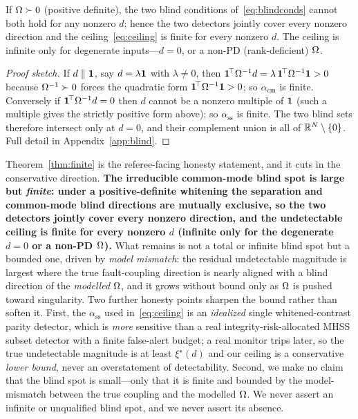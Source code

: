 \begin{theorem}
\label{thm:finite}
If $\Omega{}\succ0$ (positive definite), the two blind conditions
of~\eqref{eq:blindconds} cannot both hold for any nonzero $d$; hence the two
detectors jointly cover every nonzero direction and the ceiling~\eqref{eq:ceiling}
is finite for every nonzero $d$. The ceiling is infinite only for degenerate
inputs---$d=0$, or a non-PD (rank-deficient) $\Omega{}$.
\end{theorem}

\begin{proof}[Proof sketch]
If $d\parallel\bm 1{}$, say $d=\lambda\bm 1{}$ with $\lambda\neq0$, then
$\bm 1^{\!\top}\Omega^{-1}d=\lambda\,\bm 1^{\!\top}\Omega^{-1}\bm 1{}>0$ because
$\Omega^{-1}\succ0$ forces the quadratic form $\bm 1^{\!\top}\Omega^{-1}\bm 1{}>0$;
so $\alpha_{\mathrm{cm}}$ is finite. Conversely if
$\bm 1^{\!\top}\Omega^{-1}d=0$ then $d$ cannot be a nonzero multiple of $\bm 1{}$
(such a multiple gives the strictly positive form above); so $\alpha_{\mathrm{ss}}$
is finite. The two blind sets therefore intersect only at $d=0$, and their
complement union is all of $\mathbb{R}^N\setminus\{0\}$. Full detail in
Appendix~\ref{app:blind}.
\end{proof}

\begin{remark}
\label{rem:i1}
Theorem~\ref{thm:finite} is the referee-facing honesty statement, and it cuts in
the conservative direction. \textbf{The irreducible common-mode blind spot is
large but \emph{finite}: under a positive-definite whitening the separation and
common-mode blind directions are mutually exclusive, so the two detectors jointly
cover every nonzero direction, and the undetectable ceiling is finite for every
nonzero $d$ (infinite only for the degenerate $d=0$ or a non-PD $\Omega{}$).} What
remains is not a total or infinite blind spot but a bounded one, driven by
\emph{model mismatch}: the residual undetectable magnitude is largest where the
true fault-coupling direction is nearly aligned with a blind direction of the
\emph{modelled} $\Omega{}$, and it grows without bound only as $\Omega{}$ is pushed toward
singularity. Two further honesty points sharpen the bound rather than soften it.
First, the $\alpha_{\mathrm{ss}}$ used in~\eqref{eq:ceiling} is an \emph{idealized}
single whitened-contrast parity detector, which is \emph{more} sensitive than a
real integrity-risk-allocated MHSS subset detector with a finite false-alert
budget; a real monitor trips later, so the true undetectable magnitude is at least
$\xi^\star(d)$ and our ceiling is a conservative \emph{lower bound}, never an
overstatement of detectability. Second, we make no claim that the blind spot is
small---only that it is finite and bounded by the model-mismatch between the true
coupling and the modelled $\Omega{}$. We never assert an infinite or unqualified blind
spot, and we never assert its absence.
\end{remark}

